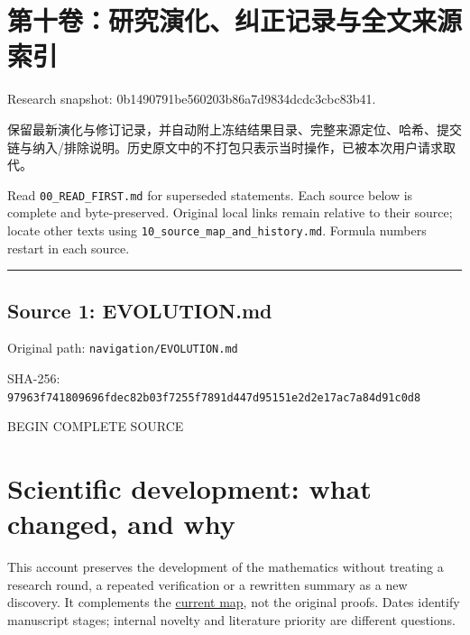 \documentclass[
  10pt,
]{article}
\author{}
\date{}
\begin{document}
\hypertarget{ux7b2cux5341ux5377ux7814ux7a76ux6f14ux5316ux7ea0ux6b63ux8bb0ux5f55ux4e0eux5168ux6587ux6765ux6e90ux7d22ux5f15}{%
\section{第十卷：研究演化、纠正记录与全文来源索引}\label{ux7b2cux5341ux5377ux7814ux7a76ux6f14ux5316ux7ea0ux6b63ux8bb0ux5f55ux4e0eux5168ux6587ux6765ux6e90ux7d22ux5f15}}

Research snapshot: 0b1490791be560203b86a7d9834dcdc3cbc83b41.

保留最新演化与修订记录，并自动附上冻结结果目录、完整来源定位、哈希、提交链与纳入/排除说明。历史原文中的不打包只表示当时操作，已被本次用户请求取代。

Read \nolinkurl{00_READ_FIRST.md} for superseded statements. Each source below is
complete and byte-preserved. Original local links remain relative to
their source; locate other texts using \nolinkurl{10_source_map_and_history.md}.
Formula numbers restart in each source.

\begin{center}\rule{0.5\linewidth}{0.5pt}\end{center}

\hypertarget{source-1-evolution.md}{%
\subsection{Source 1: EVOLUTION.md}\label{source-1-evolution.md}}

Original path: \nolinkurl{navigation/EVOLUTION.md}

SHA-256:
\nolinkurl{97963f741809696fdec82b03f7255f7891d447d95151e2d2e17ac7a84d91c0d8}

BEGIN COMPLETE SOURCE

\hypertarget{scientific-development-what-changed-and-why}{%
\section{Scientific development: what changed, and
why}\label{scientific-development-what-changed-and-why}}

This account preserves the development of the mathematics without
treating a research round, a repeated verification or a rewritten
summary as a new discovery. It complements the
\href{RESEARCH_MAP.md}{current map}, not the original proofs. Dates
identify manuscript stages; internal novelty and literature priority are
different questions.
\end{document}
